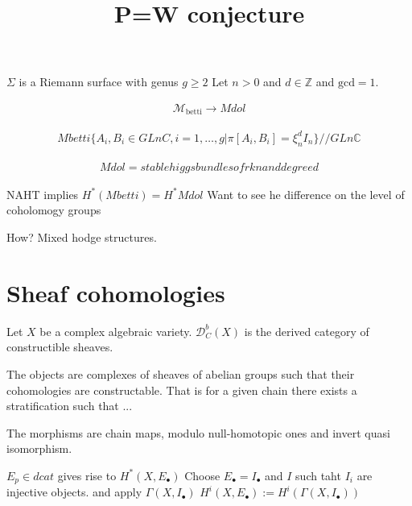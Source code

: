 
% 


\title{P=W conjecture}
\author{}
\date{}

 
\maketitle

$\Sigma$ is a Riemann surface with genus $g \geq 2 $ 
Let $ n >0 $ and $ d \in \mathbb{Z} $ and $ \mathrm{gcd} =1 $. 

\begin{align}
    \mathcal{M}_{\mathrm{betti}} \rightarrow  Mdol
\end{align}

\begin{align}
    Mbetti \{ A_i, B_i \in GLnC , i = 1, \dots, g | \pi[A_i, B_i ] = \xi ^d_n I_n \} // GLn\mathbb{C} 
\end{align}

\begin{align}
    Mdol = stable higgs bundles of rk n and degree d 
\end{align}

NAHT implies 
$ H^* ( Mbetti) = H^* Mdol$ 
Want to see he difference on the level of coholomogy groups

How? Mixed hodge structures. 

\section{Sheaf cohomologies} %

\begin{definition}
Let $X$ be a complex algebraic variety. 
    $\mathcal{D} _{C}  ^b (X) $ is the derived category of constructible sheaves. 

    The objects are complexes of sheaves of abelian groups 
    such that their cohomologies are constructable. 
    That is for a given chain there exists a stratification such that ...


    The morphisms are chain maps, modulo null-homotopic ones and invert quasi isomorphism. 
\end{definition}

$ E_p \in dcat $ gives rise to $ H ^* ( X, E_\bullet ) $ 
Choose $ E_\bullet = I _\bullet $ 
and $I$ such taht $ I_i $ are injective objects. 
and apply $\Gamma ( X, I_\bullet) $ 
$ H ^i ( X, E_\bullet ) := H^i ( \Gamma ( X, I_\bullet) ) $ 

